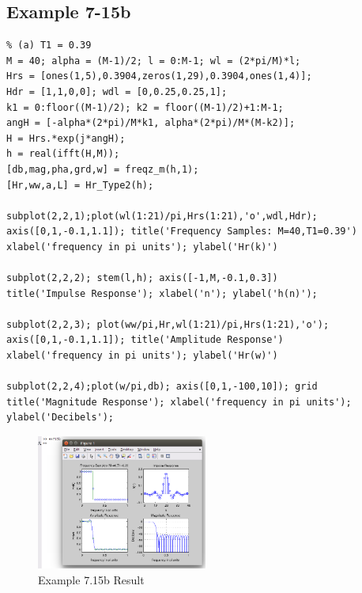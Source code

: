 \documentclass[11pt
  , a4paper
  , article
  , oneside
]{memoir}
\begin{document}
\subsection{Example 7-15b}
\begin{lstlisting}[style=termstyle]
% Example 7.15b
% (a) T1 = 0.39
M = 40; alpha = (M-1)/2; l = 0:M-1; wl = (2*pi/M)*l;
Hrs = [ones(1,5),0.3904,zeros(1,29),0.3904,ones(1,4)];
Hdr = [1,1,0,0]; wdl = [0,0.25,0.25,1];
k1 = 0:floor((M-1)/2); k2 = floor((M-1)/2)+1:M-1;
angH = [-alpha*(2*pi)/M*k1, alpha*(2*pi)/M*(M-k2)];
H = Hrs.*exp(j*angH);
h = real(ifft(H,M));
[db,mag,pha,grd,w] = freqz_m(h,1);
[Hr,ww,a,L] = Hr_Type2(h);

subplot(2,2,1);plot(wl(1:21)/pi,Hrs(1:21),'o',wdl,Hdr); 
axis([0,1,-0.1,1.1]); title('Frequency Samples: M=40,T1=0.39')
xlabel('frequency in pi units'); ylabel('Hr(k)')

subplot(2,2,2); stem(l,h); axis([-1,M,-0.1,0.3])
title('Impulse Response'); xlabel('n'); ylabel('h(n)');

subplot(2,2,3); plot(ww/pi,Hr,wl(1:21)/pi,Hrs(1:21),'o');
axis([0,1,-0.1,1.1]); title('Amplitude Response')
xlabel('frequency in pi units'); ylabel('Hr(w)')

subplot(2,2,4);plot(w/pi,db); axis([0,1,-100,10]); grid
title('Magnitude Response'); xlabel('frequency in pi units');
ylabel('Decibels');

\end{lstlisting}

\begin{figure}[h!]
	\centering
	\includegraphics[width=0.5\textwidth,height=0.4\textwidth]{./images/ex715b.png}
	\caption{Example 7.15b Result}
	\label{fig:Example 7.15b Result}
\end{figure}


\clearpage
\end{document}

